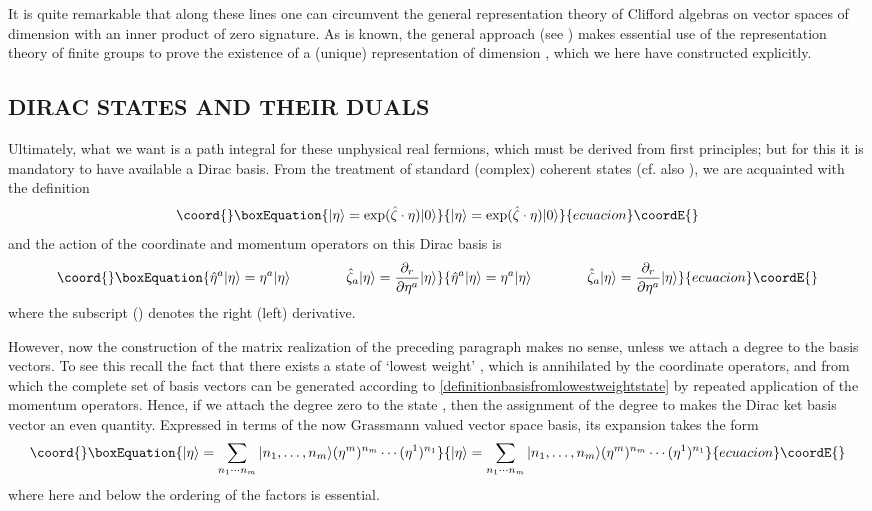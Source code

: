 \documentclass[a4paper,10pt]{article}
\begin{document}
It is quite remarkable that along these lines one can circumvent the general 
representation theory of Clifford algebras on vector spaces of dimension \coordHE{} with an 
inner product of zero signature. As is known, the general approach (see \cite{Roe 88}) makes essential 
use of the representation theory of finite groups to prove the existence of a (unique) 
representation of dimension \coordHE{}, which we here have constructed explicitly.

\subsection{DIRAC STATES AND THEIR DUALS}

Ultimately, what we want is a path integral for these unphysical real fermions, which 
must be derived from first principles; but for this it is mandatory to have available a 
Dirac basis. From the treatment of standard (complex) coherent states (cf. also 
\cite{Marn 87}), we are acquainted with the definition
\begin{equation}\coord{}\boxEquation{
|\eta\rangle=\exp(\hat{\zeta}\cdot\eta)|0\rangle
}{
|\eta\rangle=\exp(\hat{\zeta}\cdot\eta)|0\rangle
}{ecuacion}\coordE{}\end{equation}
and the action of the coordinate and momentum operators on this Dirac basis is
\begin{equation}\coord{}\boxEquation{
\hat{\eta}^a|\eta\rangle=\eta^a|\eta\rangle
\qquad\qquad\hat{\zeta}_a|\eta\rangle=\frac{\partial_r}{\partial\eta^a}|\eta\rangle
}{
\hat{\eta}^a|\eta\rangle=\eta^a|\eta\rangle
\qquad\qquad\hat{\zeta}_a|\eta\rangle=\frac{\partial_r}{\partial\eta^a}|\eta\rangle
}{ecuacion}\coordE{}\end{equation}
where the subscript \coordHE{} (\coordHE{}) denotes the right (left) derivative. 

However, now the construction of the matrix realization of the preceding paragraph makes 
no sense, unless we attach a degree to the basis vectors. To see this recall the fact  
that there exists a state of `lowest weight' \myHighlight{$|0\rangle$}\coordHE{}, which is annihilated by the 
coordinate operators, and from which the complete set of basis vectors 
\coordHE{} can be generated according to \eqref{definitionbasisfromlowestweightstate} by repeated application of the momentum operators. Hence, if we attach 
the degree zero to the state \myHighlight{$|0\rangle$}\coordHE{}, then the assignment of the degree \coordHE{} 
to \coordHE{} makes the Dirac ket basis vector \myHighlight{$|\eta\rangle$}\coordHE{} an even 
quantity. Expressed in terms of the now Grassmann valued vector space basis, its 
expansion takes the form
\begin{equation}\coord{}\boxEquation{
|\eta\rangle=\sum_{n_1\cdots n_m}|n_1,\ldots,n_m\rangle(\eta^m)^{n_m}\cdots(\eta^1)^{n_1}
}{
|\eta\rangle=\sum_{n_1\cdots n_m}|n_1,\ldots,n_m\rangle(\eta^m)^{n_m}\cdots(\eta^1)^{n_1}
}{ecuacion}\coordE{}\end{equation}
where here and below the ordering of the factors is essential.
\end{document}
